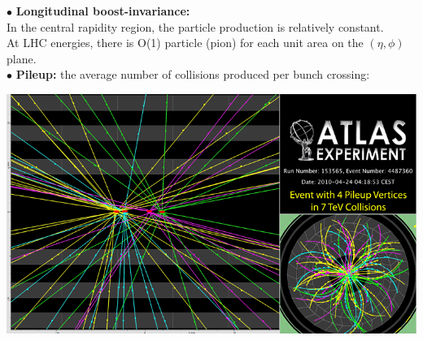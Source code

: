 \documentclass[9pt,a4paper,unknownkeysallowed,xcolor=dvipsnames,aspectratio=43]{beamer}
\begin{document}
\begin{frame}
\begin{columns}
\begin{column}{0.5\textwidth}
{\color{darkred}\Large$\bullet$} {\bf Longitudinal boost-invariance:}\\\vspace{1mm}
In the central rapidity region, the particle production is relatively constant.\\
\vspace{2mm}
At LHC energies, there is O(1) particle (pion) for each unit area on the $(\eta, \phi)$ plane.
\\
\vspace{2mm}
{\color{darkred}\Large$\bullet$} {\bf Pileup:} the average number of collisions
produced per bunch crossing:
\begin{center}
\includegraphics[width=\textwidth]{01/pileup.png}
\end{center}
\end{column}
\end{columns}
 \end{frame}
 
\end{document}
